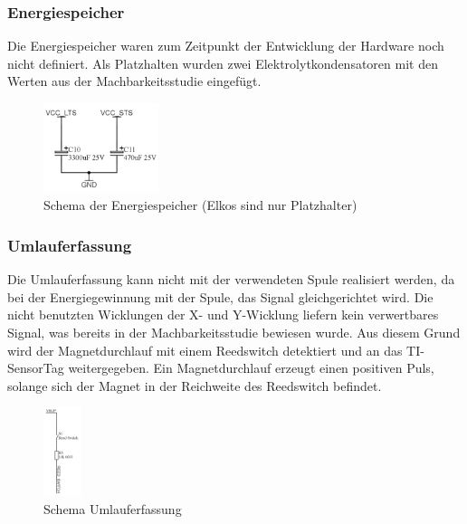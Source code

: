 \subsubsection{Energiespeicher}

Die Energiespeicher waren zum Zeitpunkt der Entwicklung der Hardware noch nicht definiert. Als Platzhalten wurden zwei Elektrolytkondensatoren mit den Werten aus der Machbarkeitsstudie eingefügt. 

\begin{figure}[ht]
    \includegraphics[width=0.3\textwidth]{3Vorgehen/imag/Schema_Energiespeicher.png}
    \caption{Schema der Energiespeicher (Elkos sind nur Platzhalter)}
    \label{schema_energiespeicher} 
\end{figure}

\subsubsection{Umlauferfassung}

Die Umlauferfassung kann nicht mit der verwendeten Spule realisiert werden, da bei der Energiegewinnung mit der Spule, das Signal gleichgerichtet wird. Die nicht benutzten Wicklungen der X- und Y-Wicklung liefern kein verwertbares Signal, was bereits in der Machbarkeitsstudie bewiesen wurde. Aus diesem Grund wird der Magnetdurchlauf mit einem Reedswitch detektiert und an das TI-SensorTag weitergegeben. Ein Magnetdurchlauf erzeugt einen positiven Puls, solange sich der Magnet in der Reichweite des Reedswitch befindet.

\begin{figure}[ht]
    \includegraphics[width=0.1\textwidth]{3Vorgehen/imag/Schema_Umlaufdetektion.png}
    \caption{Schema Umlauferfassung}\label{schema_umlaufdetektion} 
\end{figure}

